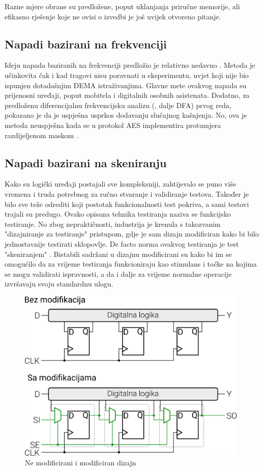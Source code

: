 \documentclass[times, utf8, diplomski]{fer}
\begin{document}
Razne mjere obrane su predložene, poput uklanjanja priručne memorije, ali efikasno rješenje koje ne ovisi o izvedbi je još uvijek otvoreno pitanje.

\subsection{Napadi bazirani na frekvenciji}

Ideju napada baziranih na frekvenciji predložio je relativno nedavno \cite{tiu2005new}. Metoda je učinkovita čak i kad tragovi nisu poravnati u eksperimentu, uvjet koji nije bio ispunjen dotadašnjim DEMA istraživanjima. Glavne mete ovakvog napada su prijenosni uređaji, poput mobitela i digitalnih osobnih asistenata. Dodatno, za predloženu diferencijalnu frekvencijsku analizu (, dalje DFA) prvog reda, pokazano je da je uspješna usprkos dodavanju slučajnog kašnjenja. No, ova je metoda neuspješna kada se u protokol AES implementira protumjera razdijeljenom maskom .

\subsection{Napadi bazirani na skeniranju}

Kako su logički uređaji postajali sve kompleksniji, zahtijevalo se puno više vremena i truda potrebnog za ručno stvaranje i validiranje testova. Također je bilo sve teže odrediti koji postotak funkcionalnosti test pokriva, a sami testovi trajali su predugo. Ovako opisana tehnika testiranja naziva se funkcijsko testiranje. No zbog nepraktičnosti, industrija je krenula s takozvanim "dizajniranje za testiranje"  pristupom, gdje je sam dizajn modificiran kako bi bilo jednostavnije testirati sklopovlje. De facto norma ovakvog testiranja je test "skeniranjem" . Bistabili sadržani u dizajnu modificirani su kako bi im se omogućilo da za vrijeme testiranja funkcioniraju kao stimulans i točke na kojima se mogu validirati ispravnosti, a da i dalje za vrijeme normalne operacije izvršavaju svoju standardnu ulogu.

\begin{figure}[htb]
    \centering
    \includegraphics[width=11cm]{resources/images/SCA/scan-test.png}
    \caption{Ne modificirani i modificiran dizajn}
    \label{fig:scan-test}
\end{figure}
\end{document}
